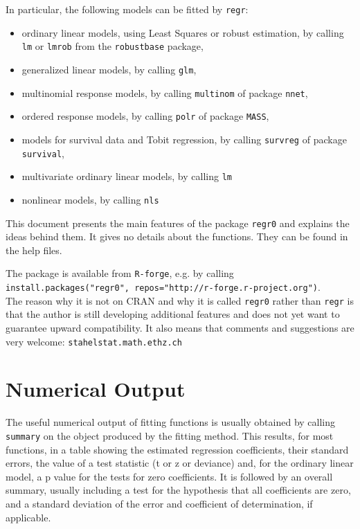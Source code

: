 \documentclass{article}
\providecommand{\T}{\texttt}
\begin{document}
In particular, the following models can be fitted by \T{regr}:
\begin{itemize}
\item 
  ordinary linear models, using Least Squares or robust estimation,
  by calling \T{lm} or \T{lmrob} from the \T{robustbase} package,
\item
  generalized linear models, by calling \T{glm},
\item
  multinomial response models, by calling \T{multinom} of package
  \T{nnet},
\item
  ordered response models, by calling \T{polr} of package
  \T{MASS},
\item
  models for survival data and Tobit regression, by calling
  \T{survreg} of package \T{survival},
\item
  multivariate ordinary linear models, by calling \T{lm}
\item
  nonlinear models, by calling \T{nls}
\end{itemize}

This document presents the main features of the package \T{regr0}
and explains the ideas behind them. 
It gives no details about the functions. They can be found in
the help files.

The package is available from \T{R-forge}, e.g. by calling\\
\T{install.packages("regr0", repos="http://r-forge.r-project.org")}.\\
The reason why it is not on CRAN and why it is called \T{regr0} rather than 
\T{regr} is that the author is still developing additional features and
does not yet want to guarantee upward compatibility.
It also means that comments and suggestions are very welcome:
\T{stahel\@ stat.math.ethz.ch} %

\section{Numerical Output}
The useful numerical output of fitting functions is usually obtained by
calling \T{summary} on the object produced by the fitting method.
This results, for most functions, in a table showing the estimated
regression coefficients, their standard errors, the value of a test
statistic (t or z or deviance) and, for the 
ordinary linear model, a p value for the tests for zero coefficients. 
It is followed by an overall summary, usually including a test for
the hypothesis that all coefficients are zero, and a standard deviation of
the error and coefficient of determination, if applicable.
\end{document}
